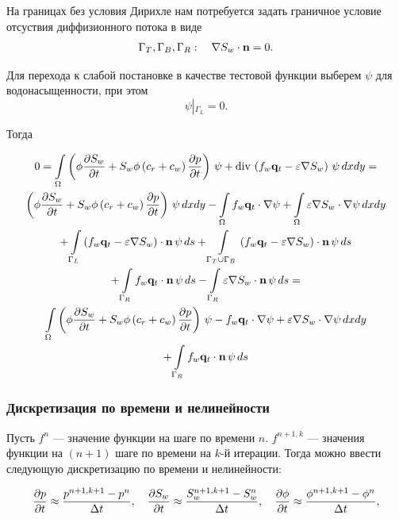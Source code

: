 На границах без условия Дирихле нам потребуется задать граничное условие отсуствия диффизионного потока в виде
\begin{equation}\label{eq:GammaTBR_Sw_diffusion}
	\Gamma_T, \Gamma_B, \Gamma_R: \quad \nabla S_w \cdot \mathbf{n} = 0.
\end{equation}

Для перехода к слабой постановке в качестве тестовой функции выберем $\psi$ для водонасыщенности, при этом 
\begin{equation}
	\psi\left|_{\Gamma_L}\right. = 0.
\end{equation}

Тогда 

\begin{multline}
	\displaystyle 0=\int\limits_\Omega  \left(\phi \dfrac{\partial S_w}{\partial t} + S_w\phi\left(c_r + c_w \right)\dfrac{\partial p}{\partial t} \right)\,\psi + \operatorname{div}\, \left( f_w \mathbf{q}_t - \varepsilon \nabla S_w \right)\, \psi \,dx dy = \\ 
	\left(\phi \dfrac{\partial S_w}{\partial t} + S_w\phi\left(c_r + c_w \right)\dfrac{\partial p}{\partial t} \right)\,\psi \,dx dy - \int\limits_\Omega  f_w \mathbf{q}_t \cdot \nabla \psi + \int\limits_\Omega \varepsilon \nabla S_w \cdot \nabla \psi \,dx dy  \\
	+\int\limits_{\Gamma_L} \left(f_w \mathbf{q}_t - \varepsilon \nabla S_w \right)\cdot \mathbf{n}\, \psi \, ds
	+\int\limits_{\Gamma_T\cup \Gamma_B} \left(f_w \mathbf{q}_t - \varepsilon \nabla S_w \right)\cdot \mathbf{n} \, \psi \, ds \\
	+\int\limits_{\Gamma_R} f_w \mathbf{q}_t \cdot \mathbf{n} \,\psi \, ds
	-\int\limits_{\Gamma_R} \varepsilon \nabla S_w \cdot \mathbf{n}\, \psi \, ds = \\
	\int\limits_\Omega \left(\phi \dfrac{\partial S_w}{\partial t} + S_w\phi\left(c_r + c_w \right)\dfrac{\partial p}{\partial t} \right)\,\psi -  f_w \mathbf{q}_t \cdot \nabla \psi +  \varepsilon \nabla S_w \cdot \nabla \psi \,dx dy \\
	+\int\limits_{\Gamma_R} f_w \mathbf{q}_t \cdot \mathbf{n} \,\psi \, ds
\end{multline}

\subsubsection{Дискретизация по времени и нелинейности}

Пусть $f^{n}$ --- значение функции на шаге по времени $n$. $f^{n+1,k}$ --- значения функции на $(n+1)$ шаге по времени на $k$-й итерации. Тогда можно ввести следующую дискретизацию по времени и нелинейности:

\begin{equation}
	\dfrac{\partial p}{\partial t} \approx \dfrac{p^{n+1, k+1}-p^{n}}{\Delta t}, \quad \dfrac{\partial S_w}{\partial t} \approx \dfrac{S_w^{n+1, k+1}-S_w^{n}}{\Delta t}, \quad \dfrac{\partial \phi}{\partial t} \approx \dfrac{\phi^{n+1, k+1}-\phi^{n}}{\Delta t},
\end{equation}

